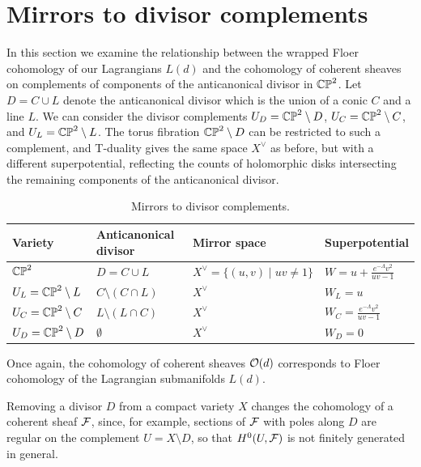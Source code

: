 \documentclass[12pt]{amsart}
\begin{document}
\section{Mirrors to divisor complements}
\label{sec:complements}

In this section we examine the relationship between the wrapped Floer
cohomology of our Lagrangians $L(d)$ and the cohomology of coherent
sheaves on complements of components of the anticanonical divisor in
$\mathbb{CP}^2$. Let $D = C \cup L$ denote the anticanonical divisor which is
the union of a conic $C$ and a line $L$. We can consider the
divisor complements $U_D =\mathbb{CP}^2 \setminus D$, $U_C = \mathbb{CP}^2 \setminus
C$, and $U_L = \mathbb{CP}^2 \setminus L$. The torus fibration $\mathbb{CP}^2
\setminus D$ can be restricted to such a complement, and T-duality
gives the same space $X^\vee$ as before, but with a different
superpotential, reflecting the counts of holomorphic disks
intersecting the remaining components of the anticanonical
divisor.

\begin{table}
  \centering
  \begin{tabular}{ll|ll}
    Variety & Anticanonical divisor & Mirror space & Superpotential\\
    \hline
    $\mathbb{CP}^2$ & $D = C \cup L$ & $X^\vee = \{(u,v) \mid uv\neq 1\}$ & $W
    = u + \frac{e^{-\Lambda}v^2}{uv-1}$\\
    $U_L = \mathbb{CP}^2 \setminus L$ & $C \setminus (C\cap L)$ & $X^\vee$ & $W_L =
    u$\\
    $U_C = \mathbb{CP}^2 \setminus C$ & $L \setminus (L\cap C)$ & $X^\vee$ & $W_C =
    \frac{e^{-\Lambda}v^2}{uv-1}$\\
    $U_D = \mathbb{CP}^2 \setminus D$ & $\emptyset$ & $X^\vee$ & $W_D = 0$
  \end{tabular}
  \caption{Mirrors to divisor complements.}
  \label{tab:divisor-complements}
\end{table}

Once again, the cohomology of coherent sheaves $\mathcal{O}(d)$ corresponds to
Floer cohomology of the Lagrangian submanifolds $L(d)$.

Removing a divisor $D$ from a compact variety $X$ changes the cohomology of a
coherent sheaf $\mathcal{F}$, since, for example, sections of $\mathcal{F}$ with poles
along $D$ are regular on the complement $U=X\setminus D$, so that
$H^0(U,\mathcal{F})$ is not finitely generated in general.
\end{document}
